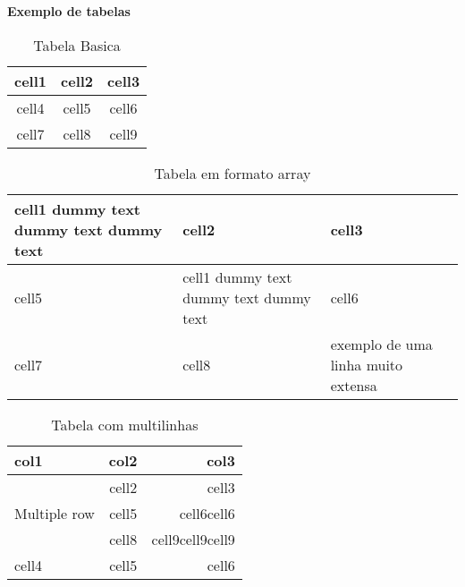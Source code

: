 \documentclass[12pt,a4paper]{report}%
\begin{document}
\textbf{Exemplo de tabelas}\\
\begin{table}[h!] %
\begin{center} %
\begin{tabular}{ | c | c | c | } %
  \hline  %
  cell1 & cell2 & cell3 \\
  \hline
  cell4 & cell5 & cell6 \\
  cell7 & cell8 & cell9 \\
  \hline
\end{tabular}
\end{center}
\caption{Tabela Basica} \label{tab:tabelaBasica}
\end{table}


\begin{table}[h!] %
\begin{center}
\begin{tabular}{ | m{5em} | p{1cm}| b{1in} | } %
\hline
cell1 dummy text dummy text dummy text& cell2 & cell3 \\
\hline
cell5 & cell1 dummy text dummy text dummy text & cell6 \\
\hline
cell7 & cell8 & exemplo de uma linha muito extensa \\
\hline
\end{tabular}
\caption{Tabela em formato array } \label{tab:tabelaArray}
\end{center}
\end{table}


\begin{table}[h!]
\begin{center}
\begin{tabular}{ |l|c|r| }
\hline
col1 & col2 & col3 \\
  \hline
  \multirow{3}{4cm}{Multiple row} & cell2 & cell3 \\ %

  & cell5 & cell6cell6 \\
  & cell8 & cell9cell9cell9 \\
  \hline
  cell4 & cell5 & cell6 \\
  \hline
\end{tabular}
\end{center}
\caption{Tabela com multilinhas}
\end{table}
\end{document}
